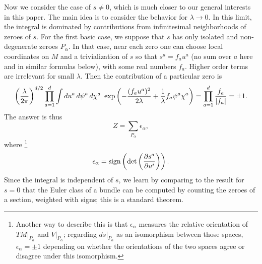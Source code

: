 \documentclass[12pt]{article}
\numberwithin{equation}{section}
\begin{document}
Now we consider the case of $s\not= 0$, which is much closer to our
general interests in this paper.  The main idea is to consider the behavior for
$\lambda\to 0$.  In this limit, the integral is dominated by contributions from
infinitesimal neighborhoods of zeroes of $s$.
For the first basic case, we suppose that $s$ has only isolated
and non-degenerate zeroes $P_\alpha$.
In that case, near each zero one can choose
local coordinates on $M$ and a trivialization of $s$ so that
$s^a=f_au^a$ (no sum over $a$ here and in similar formulas below),
with some real numbers $f_a$.  Higher order terms are irrelevant for
small $\lambda$.  Then the contribution
of a particular zero is
\begin{equation}
  \label{hudd}
  \left({\lambda\over 2\pi}\right)^{d/2} \prod_{a=1}^d\int
  du^a\,d\psi^a\,d\chi^a\,\, \exp\left(-{(f_au^a)^2\over2\lambda}+
  {1\over\lambda}f_a\psi^a\chi^a\right) =\prod_{a=1}^d{f_a\over |f_a|}=\pm 1.
\end{equation}
The answer is thus
\begin{equation}
  \label{udd}
  Z=\sum_{P_\alpha} \epsilon_\alpha,
\end{equation}
where
\footnote{Another way to describe this is that $\epsilon_\alpha$
  measures the relative orientation of $TM|_{P_\alpha}$ and
  $V|_{P_\alpha}$; regarding $ds|_{P_\alpha}$ as an isomorphism between
  those spaces, $\epsilon_\alpha=\pm 1$ depending on whether the
orientations of the two spaces agree or disagree under this isomorphism.}
\begin{equation}
  \label{invfor}
  \epsilon_\alpha={\rm sign}\left( \det\left({\partial
  s^a\over\partial u^i}\right)\right).
\end{equation}
Since the integral is independent of $s$, we learn by comparing
to the result for $s=0$ that the Euler
class of a bundle can be computed by counting the zeroes of a section,
weighted with signs; this is a standard theorem.
\end{document}
